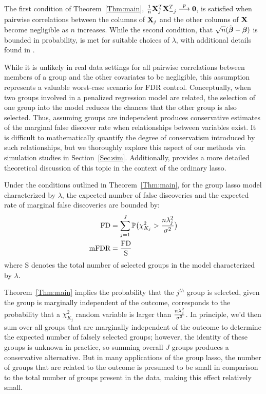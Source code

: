 The first condition of Theorem~\ref{Thm:main}, $\tfrac{1}{n}\mathbf{X}_j^T \mathbf{X}_{-j}^T \overset{p}{\longrightarrow} \mathbf{0}$, is satisfied when pairwise correlations between the columns of $\mathbf{X}_j$ and the other columns of $\mathbf{X}$ become negligible as $n$ increases. While the second condition, that $\sqrt{n}(\hat{\boldsymbol{\beta}} - \boldsymbol{\beta})$ is bounded in probability, is met for suitable choices of $\lambda$, with additional details found in \citet{Liu2009}.

While it is unlikely in real data settings for all pairwise correlations between members of a group and the other covariates to be negligible, this assumption represents a valuable worst-case scenario for FDR control. Conceptually, when two groups involved in a penalized regression model are related, the selection of one group into the model reduces the chances that the other group is also selected. Thus, assuming groups are independent produces conservative estimates of the marginal false discover rate when relationships between variables exist. It is difficult to mathematically quantify the degree of conservatism introduced by such relationships, but we thoroughly explore this aspect of our methods via simulation studies in Section~\ref{Sec:sim}. Additionally, \citet{Breheny2019} provides a more detailed theoretical discussion of this topic in the context of the ordinary lasso.
\begin{clry}
\label{Clry:main}
Under the conditions outlined in Theorem~\ref{Thm:main}, for the group lasso model characterized by $\lambda$, the expected number of false discoveries and the expected rate of marginal false discoveries are bounded by:
\begin{align}
\label{eq:Mfdr}
\begin{alignedat}{2}
\textrm{FD} &= \sum_{j = 1}^{J} \mathbb{P} \big(\chi^2_{K_j} > \frac{n\lambda_j^2}{\sigma^2}\big)\\
\textrm{mFDR} &= \frac{\textrm{FD}}{\text{S}} 
\end{alignedat}
\end{align}
where $\text{S}$ denotes the total number of selected groups in the model characterized by $\lambda$.
\end{clry}

Theorem~\ref{Thm:main} implies the probability that the $j^{th}$ group is selected, given the group is marginally independent of the outcome, corresponds to the probability that a $\chi^2_{K_j}$ random variable is larger than $\frac{n\lambda_j^2}{\sigma^2}$. In principle, we'd then sum over all groups that are marginally independent of the outcome to determine the expected number of falsely selected groups; however, the identity of these groups is unknown in practice, so summing overall $J$ groups produces a conservative alternative. But in many applications of the group lasso, the number of groups that are related to the outcome is presumed to be small in comparison to the total number of groups present in the data, making this effect relatively small.

